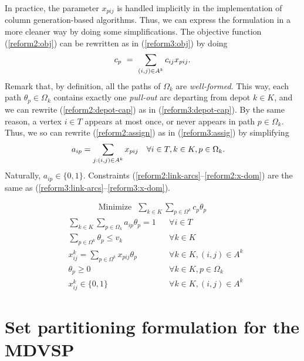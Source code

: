 \documentclass{article}
\begin{document}
In practice, the parameter $x_{pij}$ is handled implicitly in the implementation of column generation-based algorithms. Thus, we can express the formulation in a more cleaner way by doing some simplifications. The objective function (\ref{reform2:obj}) can be rewritten as in (\ref{reform3:obj}) by doing
\begin{align}
   c_p~=~\sum_{(i,j) \in A^k} c_{ij} x_{pij}. \notag
\end{align}
Remark that, by definition, all the paths of $\Omega_k$ are \textit{well-formed}. This way, each path $\theta_p \in \Omega_k$ contains exactly one \textit{pull-out} arc departing from depot $k \in K$, and we can rewrite (\ref{reform2:depot-cap}) as in (\ref{reform3:depot-cap}). By the same reason, a vertex $i \in T$ appears at most once, or never appears in path $p \in \Omega_k$. Thus, we so can rewrite (\ref{reform2:assign}) as in (\ref{reform3:assig}) by simplifying
\begin{align}
   & a_{ip} = \sum_{j:(i,j) \in A^k} x_{pij} & & \forall i \in T, k \in K, p \in \Omega_k. \notag
\end{align}
Naturally, $a_{ip} \in \{0,1\}$. Constraints (\ref{reform2:link-arcs}--\ref{reform2:x-dom}) are the same as (\ref{reform3:link-arcs}--\ref{reform3:x-dom}).

\noindent
\begin{minipage}{\linewidth}
\begin{align}
   \mathrm{Minimize~~~}\sum_{k \in K} \sum_{p \in \Omega^k} c_p \theta_p \label{reform3:obj}
\end{align}
\begin{align}
   & \sum_{k \in K} \sum_{p \in \Omega_k} a_{ip} \theta_p  = 1 & & \forall i \in T \label{reform3:assig}\\[4pt]
   & \sum_{p \in \Omega^k} \theta_p \leqslant v_k & & \forall k \in K \label{reform3:depot-cap}\\[6pt]
   & x^k_{ij} = \sum_{p \in \Omega^k} x_{pij} \theta_p & &  \forall k \in K, (i,j) \in A^k \label{reform3:link-arcs}\\
   & \theta_p \geqslant 0 & & \forall k \in K, p \in \Omega_k \label{reform3:path-dom}\\
   & x^k_{ij} \in \{0,1\} & & \forall k \in K, (i,j) \in A^k \label{reform3:x-dom}
\end{align}
\end{minipage}

\section{Set partitioning formulation for the MDVSP}
\end{document}
